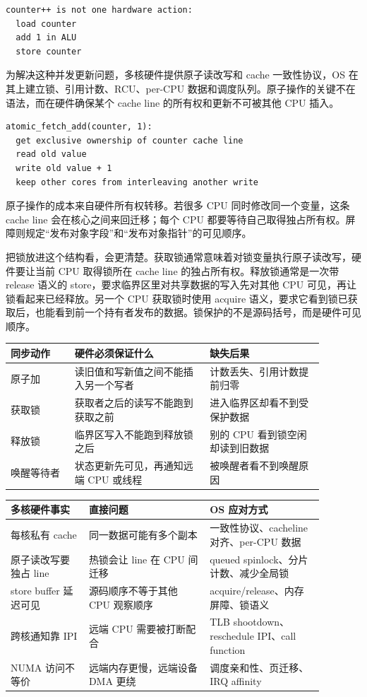 \begin{lstlisting}
counter++ is not one hardware action:
  load counter
  add 1 in ALU
  store counter
\end{lstlisting}

为解决这种并发更新问题，多核硬件提供原子读改写和 cache 一致性协议，OS 在其上建立锁、引用计数、RCU、per-CPU 数据和调度队列。原子操作的关键不在语法，而在硬件确保某个 cache line 的所有权和更新不可被其他 CPU 插入。

\begin{lstlisting}
atomic_fetch_add(counter, 1):
  get exclusive ownership of counter cache line
  read old value
  write old value + 1
  keep other cores from interleaving another write
\end{lstlisting}

原子操作的成本来自硬件所有权转移。若很多 CPU 同时修改同一个变量，这条 cache line 会在核心之间来回迁移；每个 CPU 都要等待自己取得独占所有权。屏障则规定“发布对象字段”和“发布对象指针”的可见顺序。

把锁放进这个结构看，会更清楚。获取锁通常意味着对锁变量执行原子读改写，硬件要让当前 CPU 取得锁所在 cache line 的独占所有权。释放锁通常是一次带 release 语义的 store，要求临界区里对共享数据的写入先对其他 CPU 可见，再让锁看起来已经释放。另一个 CPU 获取锁时使用 acquire 语义，要求它看到锁已获取后，也能看到前一个持有者发布的数据。锁保护的不是源码括号，而是硬件可见顺序。

\begin{longtable}{p{0.18\linewidth}p{0.38\linewidth}p{0.32\linewidth}}
\toprule
同步动作 & 硬件必须保证什么 & 缺失后果 \\
\midrule
原子加 & 读旧值和写新值之间不能插入另一个写者 & 计数丢失、引用计数提前归零 \\
获取锁 & 获取者之后的读写不能跑到获取之前 & 进入临界区却看不到受保护数据 \\
释放锁 & 临界区写入不能跑到释放锁之后 & 别的 CPU 看到锁空闲却读到旧数据 \\
唤醒等待者 & 状态更新先可见，再通知远端 CPU 或线程 & 被唤醒者看不到唤醒原因 \\
\bottomrule
\end{longtable}

\begin{longtable}{p{0.22\linewidth}p{0.34\linewidth}p{0.32\linewidth}}
\toprule
多核硬件事实 & 直接问题 & OS 应对方式 \\
\midrule
每核私有 cache & 同一数据可能有多个副本 & 一致性协议、cacheline 对齐、per-CPU 数据 \\
原子读改写要独占 line & 热锁会让 line 在 CPU 间迁移 & queued spinlock、分片计数、减少全局锁 \\
store buffer 延迟可见 & 源码顺序不等于其他 CPU 观察顺序 & acquire/release、内存屏障、锁语义 \\
跨核通知靠 IPI & 远端 CPU 需要被打断配合 & TLB shootdown、reschedule IPI、call function \\
NUMA 访问不等价 & 远端内存更慢，远端设备 DMA 更绕 & 调度亲和性、页迁移、IRQ affinity \\
\bottomrule
\end{longtable}


